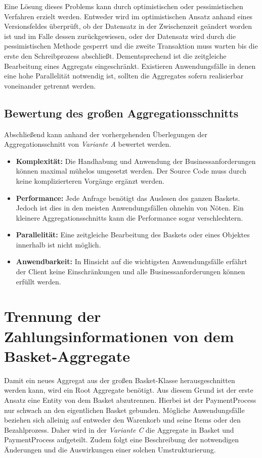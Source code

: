 Eine Lösung dieses Problems kann durch optimistischen oder pessimistischen Verfahren erzielt werden. Entweder wird im optimistischen Ansatz anhand eines Versionsfeldes überprüft, ob der Datensatz in der Zwischenzeit geändert worden ist und im Falle dessen zurückgewiesen, oder der Datensatz wird durch die pessimistischen Methode gesperrt und die zweite Transaktion muss warten bis die erste den Schreibprozess abschließt. Dementsprechend ist die zeitgleiche Bearbeitung eines Aggregats eingeschränkt. Existieren Anwendungsfälle in denen eine hohe Parallelität notwendig ist, sollten die Aggregates sofern realisierbar voneinander getrennt werden. 

\subsection{Bewertung des großen Aggregationsschnitts}

Abschließend kann anhand der vorhergehenden Überlegungen der Aggregationsschnitt von \emph{Variante A} bewertet werden.

\begin{itemize}[noitemsep,nolistsep,topsep=-2pt]
	\item \textbf{Komplexität: } {Die Handhabung und Anwendung der Businessanforderungen können maximal mühelos umgesetzt werden. Der Source Code muss durch keine komplizierteren Vorgänge ergänzt werden. }
	\item \textbf{Performance: } {Jede Anfrage benötigt das Auslesen des ganzen Baskets. Jedoch ist dies in den meisten Anwendungsfällen ohnehin von Nöten. Ein kleinere Aggregationsschnitts kann die Performance sogar verschlechtern. }
	\item \textbf{Parallelität: } {Eine zeitgleiche Bearbeitung des Baskets oder eines Objektes innerhalb ist nicht möglich.}
	\item \textbf{Anwendbarkeit: } {In Hinsicht auf die wichtigsten Anwendungsfälle erfährt der Client keine Einschränkungen und alle Businessanforderungen können erfüllt werden.}
\end{itemize}

\section{Trennung der Zahlungsinformationen von dem Basket-Aggregate}

Damit ein neues Aggregat aus der großen Basket-Klasse herausgeschnitten werden kann, wird ein Root Aggregate benötigt. Aus diesem Grund ist der erste Ansatz eine Entity von dem Basket abzutrennen. Hierbei ist der PaymentProcess nur schwach an den eigentlichen Basket gebunden. Mögliche Anwendungsfälle beziehen sich alleinig auf entweder den Warenkorb und seine Items oder den Bezahlprozess. Daher wird in der \emph{Variante C} die Aggregate in Basket und PaymentProcess aufgeteilt. Zudem folgt eine Beschreibung der notwendigen Änderungen und die Auswirkungen einer solchen Umstrukturierung.

